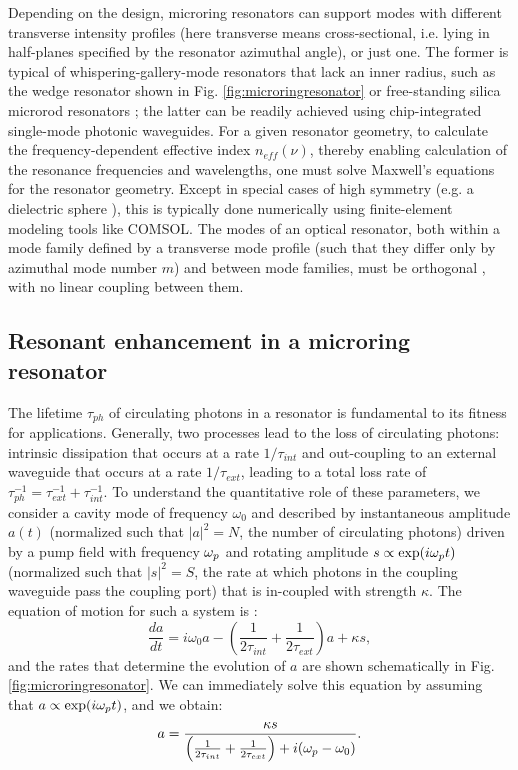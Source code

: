 Depending on the design, microring resonators can support modes with different transverse intensity profiles (here transverse means cross-sectional, i.e. lying in half-planes specified by the resonator azimuthal angle), or just one. The former is typical of whispering-gallery-mode resonators that lack an inner radius, such as the wedge resonator shown in Fig. \ref{fig:microringresonator} or free-standing silica microrod resonators \cite{DelHaye2013}; the latter can be readily achieved using chip-integrated single-mode photonic waveguides. For a given resonator geometry, to calculate the frequency-dependent effective index $n_{eff}(\nu)$, thereby enabling calculation of the resonance frequencies and wavelengths, one must solve Maxwell's equations for the resonator geometry. Except in special cases of high symmetry (e.g. a dielectric sphere \cite{Oraevsky2002}), this is typically done numerically using finite-element modeling tools like COMSOL. The modes of an optical resonator, both within a mode family defined by a transverse mode profile (such that they differ only by azimuthal mode number $m$) and between mode families, must be orthogonal \cite{Haus1984}, with no linear coupling between them.

\subsection{Resonant enhancement in a microring resonator} \label{sec:resenhancement}
 The lifetime $\tau_{ph}$ of circulating photons in a resonator is fundamental to its fitness for applications. Generally, two processes lead to the loss of circulating photons: intrinsic dissipation that occurs at a rate $1/\tau_{int}$ and out-coupling to an external waveguide that occurs at a rate $1/\tau_{ext}$, leading to a total loss rate of $\tau_{ph}^{-1}=\tau_{ext}^{-1}+\tau_{int}^{-1}$. To understand the quantitative role of these parameters, we consider a cavity mode of frequency $\omega_0$ and described by instantaneous amplitude $a(t)$ (normalized such that $|a|^2=N$, the number of circulating photons) driven by a pump field with frequency $\omega_{p}$ and rotating amplitude $s\propto\exp(i\omega_{p} t)$ (normalized such that $|s|^2=S$, the rate at which photons in the coupling waveguide pass the coupling port) that is in-coupled with strength $\kappa$. The equation of motion for such a system is \cite{Haus1984}:
 \begin{equation}
 \frac{d a}{d t}=i\omega_0 a-\left(\frac{1}{2\tau_{int}}+\frac{1}{2\tau_{ext}}\right)a+\kappa s, \label{eq:coupledmotion}
 \end{equation}
 and the rates that determine the evolution of $a$ are shown schematically in Fig. \ref{fig:microringresonator}. We can immediately solve this equation by assuming that $a\propto\exp(i\omega_{p} t)$, and we obtain:
 \begin{equation}
 a=\frac{\kappa s}{\left(\frac{1}{2\tau_{int}}+\frac{1}{2\tau_{ext}}\right)+i(\omega_{p}-\omega_0)}. \label{eq:coupledsoln}
 \end{equation}
 
